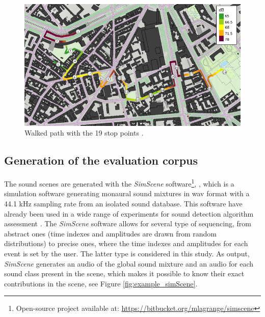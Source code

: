 \documentclass[review,5p,twocolumn,sort&compress,times]{elsarticle}
\begin{document}
\begin{figure}[t]
\centering
\includegraphics[width=\linewidth]{./figures/trajet_19pts.png}
\caption{Walked path with the 19 stop points  \cite{aumond_modelling_2017}.}
\label{fig:map_grafic}
\end{figure}


\subsection{Generation of the evaluation corpus}\label{part:simScene}
The sound scenes are generated with the \textit{SimScene} software\footnote{Open-source project available at: \url{https://bitbucket.org/mlagrange/simscene}}, \cite{rossignol_simscene:_2015}, which is a simulation software generating monaural sound mixtures in wav format with a 44.1 kHz sampling rate from an isolated sound database.
This software have already been used in a wide range of experiments for sound detection algorithm assessment \cite{lafay_new_2014, benetos2016detection}. The \textit{SimScene} software allows for several type of sequencing, from abstract ones (time indexes and amplitudes are drawn from random distributions) to  precise ones, where the time indexes and amplitudes for each event is set by the user. The latter type is considered in this study. As output, \textit{SimScene} generates an audio of the global sound mixture and an audio for each sound class present in the scene, which makes it possible to know their exact contributions in the scene, see Figure \ref{fig:example_simScene}.
\end{document}
